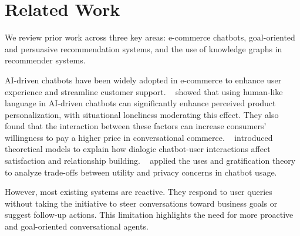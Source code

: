 \section{Related Work}
\label{sec:related_work}

We review prior work across three key areas: e-commerce chatbots, goal-oriented and persuasive recommendation systems, and the use of knowledge graphs in recommender systems.



AI-driven chatbots have been widely adopted in e-commerce to enhance user experience and streamline customer support. \citeauthor{sidlauskiene2023ai}~\cite{sidlauskiene2023ai} showed that using human-like language in AI-driven chatbots can significantly enhance perceived product personalization, with situational loneliness moderating this effect. They also found that the interaction between these factors can increase consumers’ willingness to pay a higher price in conversational commerce. \citeauthor{jiang2022ai}~\cite{jiang2022ai} introduced theoretical models to explain how dialogic chatbot-user interactions affect satisfaction and relationship building. \citeauthor{cheng2020ai}~\cite{cheng2020ai} applied the uses and gratification theory to analyze trade-offs between utility and privacy concerns in chatbot usage. 

However, most existing systems are reactive. They respond to user queries without taking the initiative to steer conversations toward business goals or suggest follow-up actions. This limitation highlights the need for more proactive and goal-oriented conversational agents.


